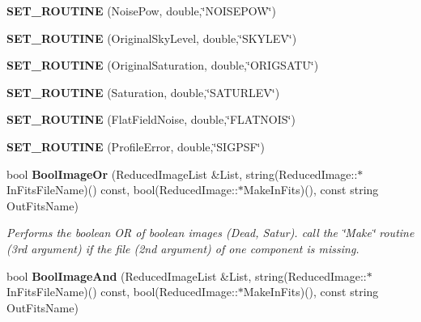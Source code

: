 \begin{CompactItemize}
\item 
{}
{\bf SET\_\-ROUTINE} (Noise\-Pow, double,\char`\"{}NOISEPOW\char`\"{})\label{reducedimage_cc_a19}

\item 
{}
{\bf SET\_\-ROUTINE} (Original\-Sky\-Level, double,\char`\"{}SKYLEV\char`\"{})\label{reducedimage_cc_a20}

\item 
{}
{\bf SET\_\-ROUTINE} (Original\-Saturation, double,\char`\"{}ORIGSATU\char`\"{})\label{reducedimage_cc_a21}

\item 
{}
{\bf SET\_\-ROUTINE} (Saturation, double,\char`\"{}SATURLEV\char`\"{})\label{reducedimage_cc_a22}

\item 
{}
{\bf SET\_\-ROUTINE} (Flat\-Field\-Noise, double,\char`\"{}FLATNOIS\char`\"{})\label{reducedimage_cc_a23}

\item 
{}
{\bf SET\_\-ROUTINE} (Profile\-Error, double,\char`\"{}SIGPSF\char`\"{})\label{reducedimage_cc_a24}

\item 
{}
bool {\bf Bool\-Image\-Or} (Reduced\-Image\-List \&List, string(Reduced\-Image::$\ast$In\-Fits\-File\-Name)() const, bool(Reduced\-Image::$\ast$Make\-In\-Fits)(), const string Out\-Fits\-Name)\label{reducedimage_cc_a25}

\begin{CompactList}\small\item\em Performs the boolean OR of boolean images (Dead, Satur). call the \char`\"{}Make\char`\"{} routine (3rd argument) if the file (2nd argument) of one component is missing.\item\end{CompactList}\item 
{}
bool {\bf Bool\-Image\-And} (Reduced\-Image\-List \&List, string(Reduced\-Image::$\ast$In\-Fits\-File\-Name)() const, bool(Reduced\-Image::$\ast$Make\-In\-Fits)(), const string Out\-Fits\-Name)\label{reducedimage_cc_a26}


\end{CompactItemize}
